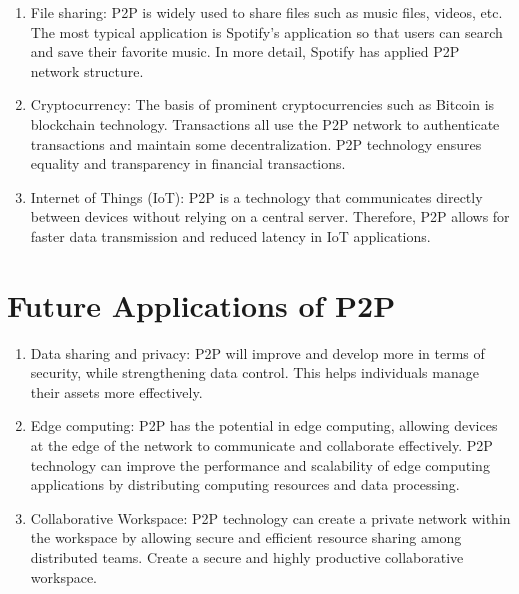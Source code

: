 \documentclass{article}
\begin{document}
	\begin{enumerate}
		\item File sharing: P2P is widely used to share files such as music files, videos, etc. The most typical application is Spotify's application so that users can search and save their favorite music. In more detail, Spotify has applied P2P network structure.
		
		\item Cryptocurrency: The basis of prominent cryptocurrencies such as Bitcoin is blockchain technology. Transactions all use the P2P network to authenticate transactions and maintain some decentralization. P2P technology ensures equality and transparency in financial transactions.
		
		\item Internet of Things (IoT): P2P is a technology that communicates directly between devices without relying on a central server. Therefore, P2P allows for faster data transmission and reduced latency in IoT applications.
	\end{enumerate}
	
	\section{Future Applications of P2P}
	
	\begin{enumerate}
		\item Data sharing and privacy: P2P will improve and develop more in terms of security, while strengthening data control. This helps individuals manage their assets more effectively.
		
		\item Edge computing: P2P has the potential in edge computing, allowing devices at the edge of the network to communicate and collaborate effectively. P2P technology can improve the performance and scalability of edge computing applications by distributing computing resources and data processing.
		
		\item Collaborative Workspace: P2P technology can create a private network within the workspace by allowing secure and efficient resource sharing among distributed teams. Create a secure and highly productive collaborative workspace.
	\end{enumerate}
\end{document}
